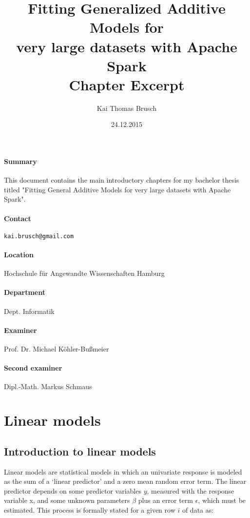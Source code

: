 \documentclass{article}
\title{
    Fitting Generalized Additive Models for\\ very large datasets with Apache Spark \\[7pt]
    \large Chapter Excerpt
}
\date{24.12.2015}
\author{Kai Thomas Brusch}
\begin{document}

    \maketitle

    \paragraph{Summary}

    This document contains the main introductory chapters for my bachelor thesis titled "Fitting General Additive Models for very large datasets with Apache Spark".

    \paragraph{Contact} \texttt{kai.brusch@gmail.com}

    \paragraph{Location} Hochschule für Angewandte Wissenschaften Hamburg
    \paragraph{Department} Dept. Informatik
    \paragraph{Examiner} Prof. Dr. Michael Köhler-Bußmeier
    \paragraph{Second examiner} Dipl.-Math. Markus Schmaus

    \newpage

    \tableofcontents

    \newpage

    \section{Linear models}

    \subsection{Introduction to linear models}
    Linear models are statistical models in which an univariate response is modeled as the sum of a ‘linear predictor’ and a zero mean random error term. The linear predictor depends on some predictor variables $y$, measured with the response variable x, and some unknown parameters $\beta$ plus an error term $\epsilon$, which must be estimated. This process is formally stated for a given row  $i$ of data as: \cite{gamBook} \cite{bigdataGAM} \cite{spark}
\end{document}
